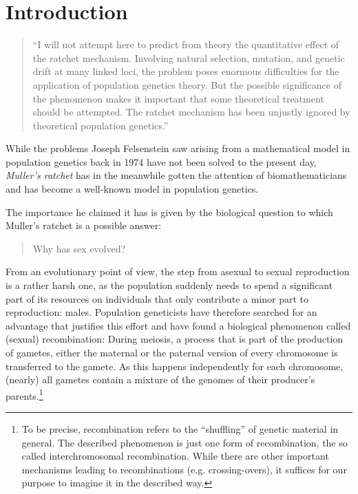 \chapter{Introduction}

\begin{quote}
``I will not attempt here to predict from theory the quantitative effect of the
ratchet mechanism. Involving natural selection, mutation, and genetic drift at many linked loci, the problem poses
enormous difficulties for the application of population genetics theory. But the possible
significance of the phenomenon makes it important that some theoretical treatment should be
attempted. The ratchet mechanism has been unjustly ignored by theoretical population genetics.''
\cite{felsenstein_evolutionary_1974}  
\end{quote}

\noindent
While the problems Joseph Felsenstein saw arising from a mathematical model in population
genetics back in 1974 have not been solved to the present day, \emph{Muller's ratchet} has 
in the meanwhile gotten the attention of biomathematicians and has become a
well-known model in population genetics.

The importance he claimed it has is given by the biological question to which
Muller's ratchet is a possible answer:
\begin{quote}Why has sex evolved?\end{quote}
From an evolutionary point of view, the step from asexual to sexual reproduction
is a rather harsh one, as the population suddenly needs to spend a significant
part of its resources on individuals that only contribute a minor part to
reproduction: males. Population geneticists have therefore searched for an
advantage that justifies this effort and have found a biological phenomenon
called (sexual) recombination: During meiosis, a process that is part of the production
of gametes, either the maternal or the paternal version of every chromosome is
transferred to the gamete. As this happens independently for each chromosome,
(nearly) all gametes contain a mixture of the genomes of their producer's 
parents.\footnote{To be precise, recombination refers to the ``shuffling''
of genetic material in general. The described phenomenon is just one form of
recombination, the so called interchromosomal recombination. While there are
other important mechanisms leading to recombinations (e.g. crossing-overs), it
suffices for our purpose to imagine it in the described way.}

